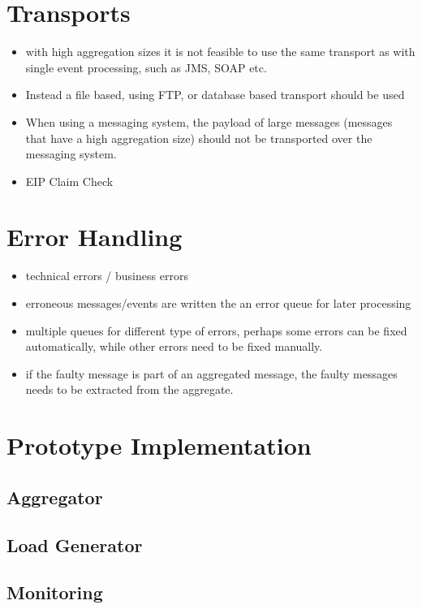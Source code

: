 \section{Transports}

\begin{itemize}
	\item with high aggregation sizes it is not feasible to use the same transport as with single event processing, such as JMS, SOAP etc.
	\item Instead a file based, using FTP, or database based transport should be used
	\item When using a messaging system, the payload of large messages (messages that have a high aggregation size) should not be transported over the messaging system. 
	\item EIP Claim Check
\end{itemize}

\section{Error Handling}

\begin{itemize}
	\item technical errors / business errors
	\item erroneous messages/events are written the an error queue for later processing
	\item multiple queues for different type of errors, perhaps some errors can be fixed automatically, while other errors need to be fixed manually.
	\item if the faulty message is part of an aggregated message, the faulty messages needs to be extracted from the aggregate.
\end{itemize}

\section{Prototype Implementation}

\subsection{Aggregator}

\subsection{Load Generator}

\subsection{Monitoring}

